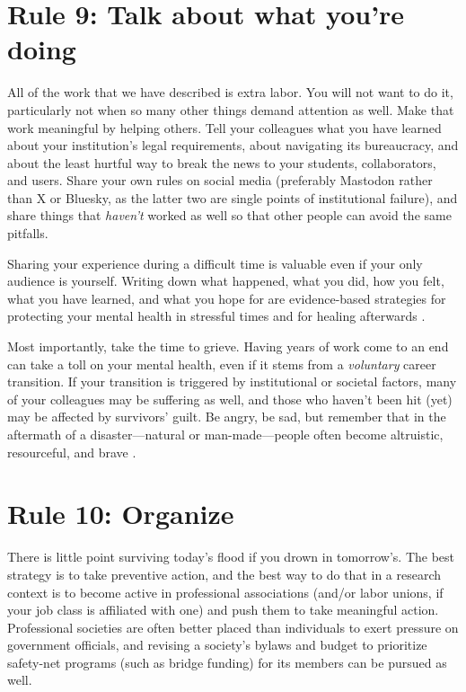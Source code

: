 \documentclass[10pt,letterpaper]{article}
\begin{document}
\section*{Rule 9: Talk about what you're doing}

All of the work that we have described is extra labor.
You will not want to do it,
particularly not when so many other things demand attention as well.
Make that work meaningful by helping others.
Tell your colleagues what you have learned about your institution's legal requirements,
about navigating its bureaucracy,
and about the least hurtful way to break the news to your students, collaborators, and users.
Share your own rules on social media
(preferably Mastodon rather than X or Bluesky,
as the latter two are single points of institutional failure),
and share things that \emph{haven't} worked as well
so that other people can avoid the same pitfalls.

Sharing your experience during a difficult time is valuable even if your only audience is yourself.
Writing down what happened, what you did, how you felt, what you have learned, and what you hope for
are evidence-based strategies for protecting your mental health in stressful times
and for healing afterwards \cite{Pennebaker2016,Cullen2022}.

Most importantly,
take the time to grieve.
Having years of work come to an end can take a toll on your mental health,
even if it stems from a \emph{voluntary} career transition.
If your transition is triggered by institutional or societal factors, many of your colleagues may be suffering as well,
and those who haven't been hit (yet) may be affected by survivors' guilt.
Be angry,
be sad,
but remember that in the aftermath of a disaster---natural or man-made---people
often become altruistic, resourceful, and brave \cite{Yang2024}.

\section*{Rule 10: Organize}

There is little point surviving today's flood if you drown in tomorrow's.
The best strategy is to take preventive action,
and the best way to do that in a research context
is to become active in professional associations
(and/or labor unions, if your job class is affiliated with one)
and push them to take meaningful action.
Professional societies are often better placed than individuals to exert pressure on government officials,
and revising a society's bylaws and budget to prioritize safety-net programs (such as bridge funding) for its members can be pursued as well.
\end{document}
